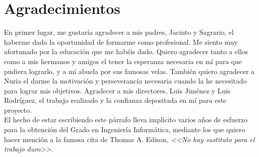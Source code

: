 \chapter*{Agradecimientos}
En primer lugar, me gustaría agradecer a mis padres, Jacinto y Sagrario, el haberme dado la oportunidad de formarme como profesional. Me siento muy afortunado por la educación que me habéis dado. Quiero agradecer tanto a ellos como a mis hermanos y amigos el tener la esperanza necesaria en mí para que pudiera lograrlo, y a mi abuela por sus famosas velas.
También quiero agradecer a Nuria el darme la motivación y perseverancia necesaria cuando la he necesitado para lograr mis objetivos.
Agradecer a mis directores, Luis Jiménez y Luis Rodríguez, el trabajo realizado y la confianza depositada en mí para este proyecto.\\

El hecho de estar escribiendo este párrafo lleva implícito varios años de esfuerzo para la obtención del Grado en Ingeniería Informática, mediante los que quiero hacer mención a la famosa cita de Thomas A. Edison, \emph{<<No hay sustituto para el trabajo duro>>}.
\makeatletter
\begin{flushright}
	\textit{\@autor}
\end{flushright}
\makeatother
